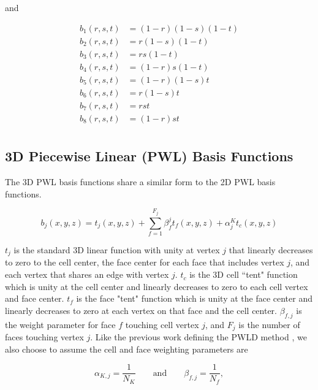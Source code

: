 \noindent and

\begin{equation}
\label{eq::TriL_basis_functions}
\begin{aligned}
	b_1(r,s,t) & = (1-r)(1-s)(1-t) \\
	b_2(r,s,t) & = r(1-s)(1-t) \\
	b_3(r,s,t) & = rs(1-t) \\
	b_4(r,s,t) & = (1-r)s(1-t) \\
	b_5(r,s,t) & = (1-r)(1-s)t \\
	b_6(r,s,t) & = r(1-s)t \\
	b_7(r,s,t) & = rst \\
	b_8(r,s,t) & = (1-r)st \\
\end{aligned}
\end{equation}

\subsection{3D Piecewise Linear (PWL) Basis Functions}
\label{sec::BF_3DLinear_PWL}

The 3D PWL basis functions share a similar form to the 2D PWL basis functions.

\begin{equation}
\label{eq::PWL_3D}
	b_j (x,y,z)  = t_j  (x,y,z) + \sum_{f=1}^{F_j} \beta_f^j  t_f (x,y,z) + \alpha_j^K t_c  (x,y,z)
\end{equation}

\noindent $t_j$ is the standard 3D linear function with unity at vertex $j$ that linearly decreases to zero to the cell center, the face center for each face that includes vertex $j$, and each vertex that shares an edge with vertex $j$. $t_c$ is the 3D cell ``tent" function which is unity at the cell center and linearly decreases to zero to each cell vertex and face center. $t_f$ is the face "tent" function which is unity at the face center and linearly decreases to zero at each vertex on that face and the cell center. $\beta_{f,j}$ is the weight parameter for face $f$ touching cell vertex $j$, and $F_j$ is the number of faces touching vertex $j$. Like the previous work defining the PWLD method \cite{bailey2008phd}, we also choose to assume the cell and face weighting parameters are

\begin{equation}
\alpha_{K,j} = \frac{1}{N_K} \qquad \text{and} \qquad \beta_{f,j} = \frac{1}{N_f},
\label{eq::PWL_weight_vals}
\end{equation}

